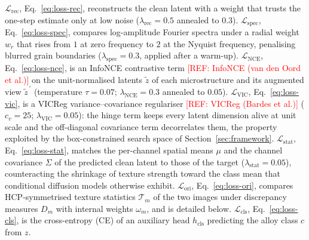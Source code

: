 \documentclass[preprint,12pt]{elsarticle}
\newcommand{\refneeded}[1]{\textcolor{red}{[REF: #1]}} %
\begin{document}
$\mathcal{L}_{\mathrm{rec}}$, Eq.~\eqref{eq:loss-rec}, reconstructs the clean latent with a weight that trusts the one-step estimate only at low noise ($\lambda_{\mathrm{rec}} = 0.5$ annealed to $0.3$). $\mathcal{L}_{\mathrm{spec}}$, Eq.~\eqref{eq:loss-spec}, compares log-amplitude Fourier spectra under a radial weight $w_r$ that rises from $1$ at zero frequency to $2$ at the Nyquist frequency, penalising blurred grain boundaries ($\lambda_{\mathrm{spec}} = 0.3$, applied after a warm-up). $\mathcal{L}_{\mathrm{NCE}}$, Eq.~\eqref{eq:loss-nce}, is an InfoNCE contrastive term \refneeded{InfoNCE (van den Oord et al.)} on the unit-normalised latents $\tilde{z}$ of each microstructure and its augmented view $\tilde{z}^{\,\prime}$ (temperature $\tau = 0.07$; $\lambda_{\mathrm{NCE}} = 0.3$ annealed to $0.05$). $\mathcal{L}_{\mathrm{VIC}}$, Eq.~\eqref{eq:loss-vic}, is a VICReg variance--covariance regulariser \refneeded{VICReg (Bardes et al.)} ($c_v = 25$; $\lambda_{\mathrm{VIC}} = 0.05$): the hinge term keeps every latent dimension alive at unit scale and the off-diagonal covariance term decorrelates them, the property exploited by the box-constrained search space of Section~\ref{sec:framework}. $\mathcal{L}_{\mathrm{stat}}$, Eq.~\eqref{eq:loss-stat}, matches the per-channel spatial means $\mu$ and the channel covariance $\Sigma$ of the predicted clean latent to those of the target ($\lambda_{\mathrm{stat}} = 0.05$), counteracting the shrinkage of texture strength toward the class mean that conditional diffusion models otherwise exhibit. $\mathcal{L}_{\mathrm{ori}}$, Eq.~\eqref{eq:loss-ori}, compares HCP-symmetrised texture statistics $\mathcal{T}_m$ of the two images under discrepancy measures $D_m$ with internal weights $\omega_m$, and is detailed below. $\mathcal{L}_{\mathrm{cls}}$, Eq.~\eqref{eq:loss-cls}, is the cross-entropy (CE) of an auxiliary head $h_{\mathrm{cls}}$ predicting the alloy class $c$ from $z$.
\end{document}

